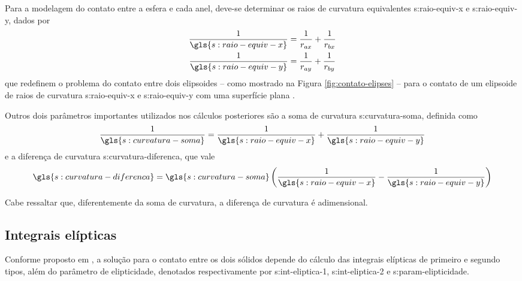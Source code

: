 \documentclass[12pt,oneside,english,brazil,lmodern,siglas,simbolos,cite=num]{ucsmonograph}
\begin{document}
	Para a modelagem do contato entre a esfera e cada anel, deve-se determinar os raios de curvatura equivalentes \gls{s:raio-equiv-x} e \gls{s:raio-equiv-y}, dados por
	\begin{gather}
		\frac{1}{\gls{s:raio-equiv-x}} = \frac{1}{r_{ax}} +
		\frac{1}{r_{bx}} \label{eqn:seco:r-equiv-x} \\
		\frac{1}{\gls{s:raio-equiv-y}} = \frac{1}{r_{ay}} +
		\frac{1}{r_{by}} \label{eqn:seco:r-equiv-y}
	\end{gather}
	que redefinem o problema do contato entre dois elipsoides -- como mostrado na Figura \ref{fig:contato-elipses} -- para o contato de um elipsoide de raios de curvatura \gls{s:raio-equiv-x} e \gls{s:raio-equiv-y} com uma superfície plana \cite{hamrock:1991}.
	
	Outros dois parâmetros importantes utilizados nos cálculos posteriores são a soma de curvatura \gls{s:curvatura-soma}, definida como \cite{wijnant:1998}
	\begin{equation} \label{eqn:seco:curv-soma}
		\frac{1}{\gls{s:curvatura-soma}} =
		\frac{1}{\gls{s:raio-equiv-x}} + \frac{1}{\gls{s:raio-equiv-y}}
	\end{equation}
	e a diferença de curvatura \gls{s:curvatura-diferenca}, que vale
	\begin{equation} \label{eqn:seco:curv-diferenca}
		\gls{s:curvatura-diferenca} = \gls{s:curvatura-soma}
		\left( \frac{1}{\gls{s:raio-equiv-x}} - 
		\frac{1}{\gls{s:raio-equiv-y}} \right)
	\end{equation}
	
	Cabe ressaltar que, diferentemente da soma de curvatura, a diferença de curvatura é adimensional.
	
	\subsection{Integrais elípticas} \label{sec:int-elipticas}
	Conforme proposto em \cite{hertz:1881}, a solução para o contato entre os dois sólidos depende do cálculo das integrais elípticas de primeiro e segundo tipos, além do parâmetro de elipticidade, denotados respectivamente por \gls{s:int-eliptica-1}, \gls{s:int-eliptica-2} e \gls{s:param-elipticidade}.
	
\end{document}

